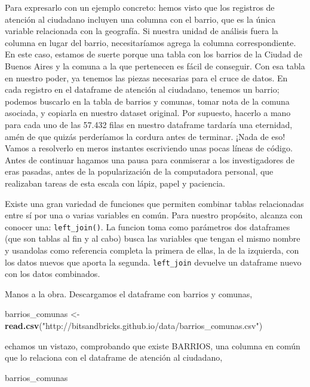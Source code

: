 \documentclass[spanish,]{book}
\newenvironment{Shaded}{\begin{snugshade}}{\end{snugshade}}
\newcommand{\KeywordTok}[1]{\textcolor[rgb]{0.13,0.29,0.53}{\textbf{#1}}}
\newcommand{\NormalTok}[1]{#1}
\newcommand{\StringTok}[1]{\textcolor[rgb]{0.31,0.60,0.02}{#1}}
\begin{document}
Para expresarlo con un ejemplo concreto: hemos visto que los registros de atención al ciudadano incluyen una columna con el barrio, que es la única variable relacionada con la geografía. Si nuestra unidad de análisis fuera la columna en lugar del barrio, necesitaríamos agrega la columna correspondiente. En este caso, estamos de suerte porque una tabla con los barrios de la Ciudad de Buenos Aires y la comuna a la que pertenecen es fácil de conseguir. Con esa tabla en nuestro poder, ya tenemos las piezas necesarias para el cruce de datos. En cada registro en el dataframe de atención al ciudadano, tenemos un barrio; podemos buscarlo en la tabla de barrios y comunas, tomar nota de la comuna asociada, y copiarla en nuestro dataset original. Por supuesto, hacerlo a mano para cada uno de las 57.432 filas en nuestro dataframe tardaría una eternidad, amén de que quizás perderíamos la cordura antes de terminar. ¡Nada de eso! Vamos a resolverlo en meros instantes escriviendo unas pocas líneas de código. Antes de continuar hagamos una pausa para conmiserar a los investigadores de eras pasadas, antes de la popularización de la computadora personal, que realizaban tareas de esta escala con lápiz, papel y paciencia.

Existe una gran variedad de funciones que permiten combinar tablas relacionadas entre sí por una o varias variables en común. Para nuestro propósito, alcanza con conocer una: \texttt{left\_join()}. La funcion toma como parámetros dos dataframes (que son tablas al fin y al cabo) busca las variables que tengan el mismo nombre y usandolas como referencia completa la primera de ellas, la de la izquierda, con los datos nuevos que aporta la segunda. \texttt{left\_join} devuelve un dataframe nuevo con los datos combinados.

Manos a la obra. Descargamos el dataframe con barrios y comunas,

\begin{Shaded}
\begin{Highlighting}[]
\NormalTok{barrios_comunas <-}\StringTok{ }\KeywordTok{read.csv}\NormalTok{(}\StringTok{"http://bitsandbricks.github.io/data/barrios_comunas.csv"}\NormalTok{)}
\end{Highlighting}
\end{Shaded}

echamos un vistazo, comprobando que existe BARRIOS, una columna en común que lo relaciona con el dataframe de atención al ciudadano,

\begin{Shaded}
\begin{Highlighting}[]
\NormalTok{barrios_comunas}
\end{Highlighting}
\end{Shaded}
\end{document}
